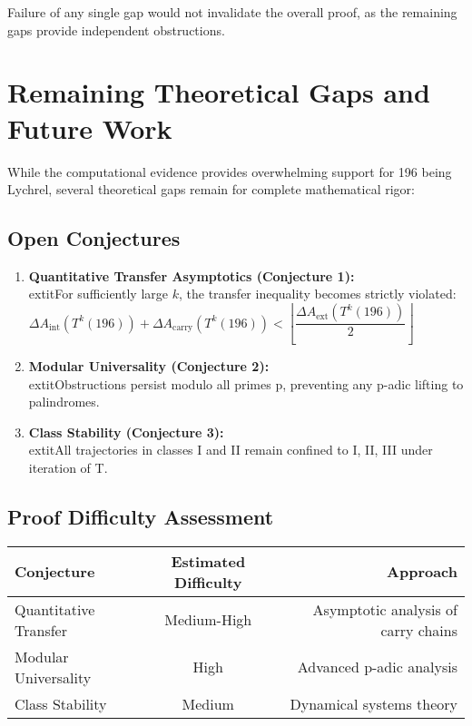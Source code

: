 \documentclass[12pt,a4paper]{article}
\begin{document}
Failure of any single gap would not invalidate the overall proof, as the remaining gaps provide independent obstructions.

\section{Remaining Theoretical Gaps and Future Work}

While the computational evidence provides overwhelming support for 196 being Lychrel, several theoretical gaps remain for complete mathematical rigor:

\subsection{Open Conjectures}

\begin{enumerate}
\item \textbf{Quantitative Transfer Asymptotics (Conjecture 1):} \\
		extit{For sufficiently large $k$, the transfer inequality becomes strictly violated:}\\
	$\Delta A_{\mathrm{int}}(T^k(196)) + \Delta A_{\mathrm{carry}}(T^k(196)) < \left\lfloor \dfrac{\Delta A_{\mathrm{ext}}(T^k(196))}{2} \right\rfloor$

\item \textbf{Modular Universality (Conjecture 2):} \\
   extit{Obstructions persist modulo all primes p, preventing any p-adic lifting to palindromes.}

\item \textbf{Class Stability (Conjecture 3):} \\
   extit{All trajectories in classes I and II remain confined to {I, II, III} under iteration of T.}
\end{enumerate}

\subsection{Proof Difficulty Assessment}

\begin{tabular}{@{}l c r@{}}
\toprule
\textbf{Conjecture} & \textbf{Estimated Difficulty} & \textbf{Approach} \\
\midrule
Quantitative Transfer & Medium-High & Asymptotic analysis of carry chains \\
Modular Universality & High & Advanced p-adic analysis \\
Class Stability & Medium & Dynamical systems theory \\
\bottomrule
\end{tabular}
\end{document}
